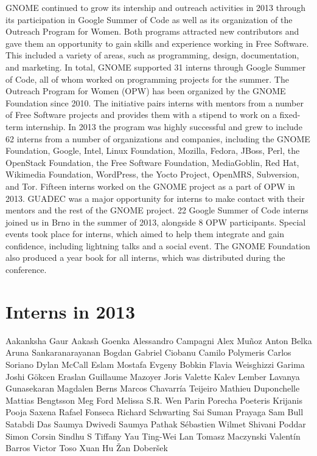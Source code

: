 \documentclass{scrreprt}
\begin{document}
GNOME continued to grow its intership and outreach activities in 2013 through its participation in Google Summer of Code  as well as its organization of the Outreach Program for Women. Both programs attracted new contributors and gave them an opportunity to gain skills and experience working in Free Software. This included a variety of areas, such as programming, design, documentation, and marketing.
In total, GNOME supported 31 interns through Google Summer of Code, all of whom worked on programming projects for the summer.
The Outreach Program for Women (OPW) has been organized by the GNOME Foundation since 2010. The initiative pairs interns with mentors from a number of Free Software projects and provides them with a stipend to work on a fixed-term internship. In 2013 the program was highly successful and grew to include 62 interns from a number of organizations and companies, including the GNOME Foundation, Google, Intel, Linux Foundation, Mozilla, Fedora, JBoss, Perl, the OpenStack Foundation, the Free Software Foundation, MediaGoblin, Red Hat, Wikimedia Foundation, WordPress, the Yocto Project, OpenMRS, Subversion, and Tor. Fifteen interns worked on the GNOME project as a part of OPW in 2013.
GUADEC was a major opportunity for interns to make contact with their mentors and the rest of the GNOME project. 22 Google Summer of Code interns joined us in Brno in the summer of 2013, alongside 8 OPW participants. Special events took place for interns, which aimed to help them integrate and gain confidence, including lightning talks and a social event. The GNOME Foundation also produced a year book for all interns, which was distributed during the conference.




\section{Interns in 2013}

Aakanksha Gaur
Aakash Goenka
Alessandro Campagni
Alex Muñoz
Anton Belka
Aruna Sankaranarayanan
Bogdan Gabriel Ciobanu
Camilo Polymeris
Carlos Soriano
Dylan McCall
Eslam Mostafa
Evgeny Bobkin
Flavia Weisghizzi
Garima Joshi
Gökcen Eraslan
Guillaume Mazoyer
Joris Valette
Kalev Lember
Lavanya Gunasekaran
Magdalen Berns
Marcos Chavarría Teijeiro
Mathieu Duponchelle
Mattias Bengtsson
Meg Ford
Melissa S.R. Wen
Parin Porecha
Poeteris Krijanis
Pooja Saxena
Rafael Fonseca
Richard Schwarting
Sai Suman Prayaga
Sam Bull
Satabdi Das
Saumya Dwivedi
Saumya Pathak
Sébastien Wilmet
Shivani Poddar
Simon Corsin
Sindhu S
Tiffany Yau
Ting-Wei Lan
Tomasz Maczynski
Valentín Barros
Victor Toso
Xuan Hu
Žan Doberšek
\end{document}
